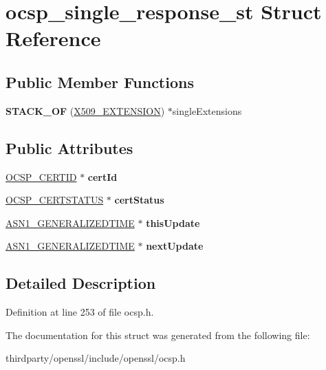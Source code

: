 \hypertarget{structocsp__single__response__st}{}\section{ocsp\+\_\+single\+\_\+response\+\_\+st Struct Reference}
\label{structocsp__single__response__st}
\subsection*{Public Member Functions}
\begin{DoxyCompactItemize}
\item 
\mbox{\label{structocsp__single__response__st_a13e580cb5e59deb598f80513db57cefc}} 
{\bfseries S\+T\+A\+C\+K\+\_\+\+OF} (\hyperlink{struct_x509__extension__st}{X509\+\_\+\+E\+X\+T\+E\+N\+S\+I\+ON}) $\ast$single\+Extensions
\end{DoxyCompactItemize}
\subsection*{Public Attributes}
\begin{DoxyCompactItemize}
\item 
\mbox{\label{structocsp__single__response__st_af26393e48e4a9f18955ec0b1785961fb}} 
\hyperlink{structocsp__cert__id__st}{O\+C\+S\+P\+\_\+\+C\+E\+R\+T\+ID} $\ast$ {\bfseries cert\+Id}
\item 
\mbox{\label{structocsp__single__response__st_a2d8ac66aea93406dbf48c722c8f2d185}} 
\hyperlink{structocsp__cert__status__st}{O\+C\+S\+P\+\_\+\+C\+E\+R\+T\+S\+T\+A\+T\+US} $\ast$ {\bfseries cert\+Status}
\item 
\mbox{\label{structocsp__single__response__st_a1ed7424e4d254f4af8499303dce9ffb2}} 
\hyperlink{structasn1__string__st}{A\+S\+N1\+\_\+\+G\+E\+N\+E\+R\+A\+L\+I\+Z\+E\+D\+T\+I\+ME} $\ast$ {\bfseries this\+Update}
\item 
\mbox{\label{structocsp__single__response__st_a54c06d485bae1de66d1e0b58403b2e25}} 
\hyperlink{structasn1__string__st}{A\+S\+N1\+\_\+\+G\+E\+N\+E\+R\+A\+L\+I\+Z\+E\+D\+T\+I\+ME} $\ast$ {\bfseries next\+Update}
\end{DoxyCompactItemize}


\subsection{Detailed Description}


Definition at line 253 of file ocsp.\+h.



The documentation for this struct was generated from the following file\+:\begin{DoxyCompactItemize}
\item 
thirdparty/openssl/include/openssl/ocsp.\+h\end{DoxyCompactItemize}
